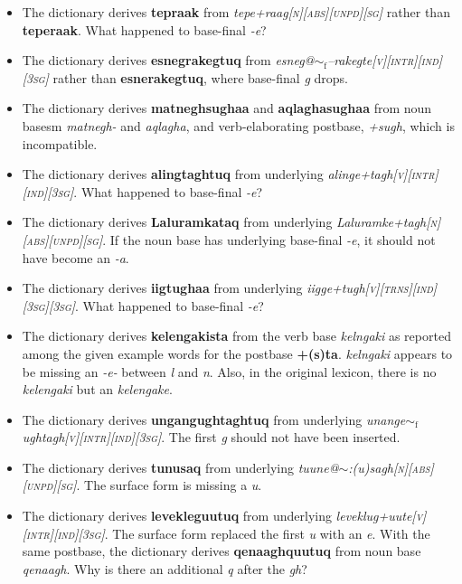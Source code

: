 \documentclass{article}
\begin{document}
\begin{itemize}
\item The dictionary derives \textbf{tepraak} from \textit{tepe+raag\textsc{[n][abs][unpd][sg]}} rather than \textbf{teperaak}. What happened to base-final \textit{-e}?

\item The dictionary derives \textbf{esnegrakegtuq} from \textit{esneg@$\sim_\text{f}$--rakegte\textsc{[v][intr][ind][3sg]}} rather than \textbf{esnerakegtuq}, where base-final \textit{g} drops.

\item The dictionary derives \textbf{matneghsughaa} and \textbf{aqlaghasughaa} from noun basesm \textit{matnegh-} and \textit{aqlagha}, and verb-elaborating postbase, \textit{+sugh}, which is incompatible.

\item The dictionary derives \textbf{alingtaghtuq} from underlying \textit{alinge+tagh\textsc{[v][intr][ind][3sg]}}. What happened to base-final \textit{-e}?

\item The dictionary derives \textbf{Laluramkataq} from underlying \textit{Laluramke+tagh\textsc{[n][abs][unpd][sg]}}. If the noun base has underlying base-final \textit{-e}, it should not have become an \textit{-a}.

\item The dictionary derives \textbf{iigtughaa} from underlying \textit{iigge+tugh\textsc{[v][trns][ind][3sg][3sg]}}. What happened to base-final \textit{-e}?

\item The dictionary derives \textbf{kelengakista} from the verb base \textit{kelngaki} as reported among the given example words for the postbase \textbf{+(s)ta}. \textit{kelngaki} appears to be missing an \textit{-e-} between \textit{l} and \textit{n}. Also, in the original lexicon, there is no \textit{kelengaki} but an \textit{kelengake}.
  
\item The dictionary derives \textbf{ungangughtaghtuq} from underlying \textit{unange$\sim_\text{f}$ughtagh\textsc{[v][intr][ind][3sg]}}. The first \textit{g} should not have been inserted.

\item The dictionary derives \textbf{tunusaq} from underlying \textit{tuune@$\sim$:(u)sagh\textsc{[n][abs][unpd][sg]}}. The surface form is missing a \textit{u}.

\item The dictionary derives \textbf{levekleguutuq} from underlying \textit{leveklug+uute\textsc{[v][intr][ind][3sg]}}. The surface form replaced the first \textit{u} with an \textit{e}. With the same postbase, the dictionary derives \textbf{qenaaghquutuq} from noun base \textit{qenaagh}. Why is there an additional \textit{q} after the \textit{gh}?


\end{itemize}
\end{document}
